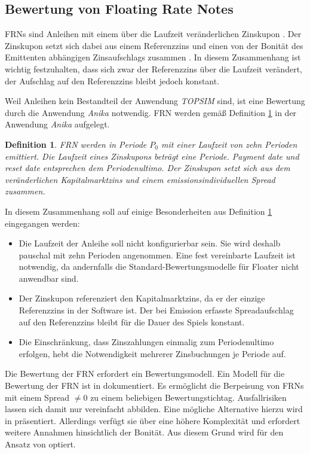 \documentclass[12pt, a4paper]{article}
\theoremstyle{plain}
\newtheorem{definition}{Definition}
\begin{document}
\subsection{Bewertung von Floating Rate Notes}
\label{sec:bewertung_von_floating_rate_notes}
\glspl{FRN} sind Anleihen mit einem über die Laufzeit veränderlichen Zinskupon \autocite[][373]{fabozzi_handbook_2005}. Der Zinskupon setzt sich dabei aus einem Referenzzins und einen von der Bonität des Emittenten abhängigen Zinsaufschlags zusammen \autocite[][374]{fabozzi_handbook_2005}. In diesem Zusammenhang ist wichtig festzuhalten, dass sich zwar der Referenzzins über die Laufzeit verändert, der Aufschlag auf den Referenzzins bleibt jedoch konstant.

Weil Anleihen kein Bestandteil der Anwendung \textit{TOPSIM} sind, ist eine Bewertung durch die Anwendung \textit{Anika} notwendig. \gls{FRN} werden gemäß Definition \ref{def:floater} in der Anwendung \textit{Anika} aufgelegt.

\begin{definition}
	\label{def:floater}
	\gls{FRN} werden in Periode $P_0$ mit einer Laufzeit von zehn Perioden emittiert. Die Laufzeit eines Zinskupons beträgt eine Periode. \textit{Payment date} und \textit{reset date} entsprechen dem Periodenultimo. Der Zinskupon setzt sich aus dem veränderlichen Kapitalmarktzins und einem emissionsindividuellen Spread zusammen.
\end{definition}

In diesem Zusammenhang soll auf einige Besonderheiten aus Definition \ref{def:floater} eingegangen werden:
\begin{itemize}
	\item Die Laufzeit der Anleihe soll nicht konfigurierbar sein. Sie wird deshalb pauschal mit zehn Perioden angenommen. Eine fest vereinbarte Laufzeit ist notwendig, da andernfalls die Standard-Bewertungsmodelle für Floater nicht anwendbar sind. 
	\item Der Zinskupon referenziert den Kapitalmarktzins, da er der einzige Referenzzins in der Software ist. Der bei Emission erfasste Spreadaufschlag auf den Referenzzins bleibt für die Dauer des Spiels konstant.
	\item Die Einschränkung, dass Zinszahlungen einmalig zum Periodenultimo erfolgen, hebt die Notwendigkeit mehrerer Zinsbuchungen je Periode auf.
\end{itemize}

Die Bewertung der \gls{FRN} erfordert ein Bewertungsmodell. Ein Modell für die Bewertung der \gls{FRN} ist in \textcite[][S.~31~f.]{alexander_market_2008} dokumentiert. 
Es ermöglicht die Berpeisung von \glspl{FRN} mit einem Spread $\neq0$ zu einem beliebigen Bewertungstichtag.
Ausfallrisiken lassen sich damit nur vereinfacht abbilden.
Eine mögliche Alternative hierzu wird in \textcite[][S.~65~f.]{schonbucher_credit_2003} präsentiert. Allerdings verfügt sie über eine höhere Komplexität und erfordert weitere Annahmen hinsichtlich der Bonität. Aus diesem Grund wird für den Ansatz von \textcite[][S.~31~f.]{alexander_market_2008} optiert.
\end{document}
